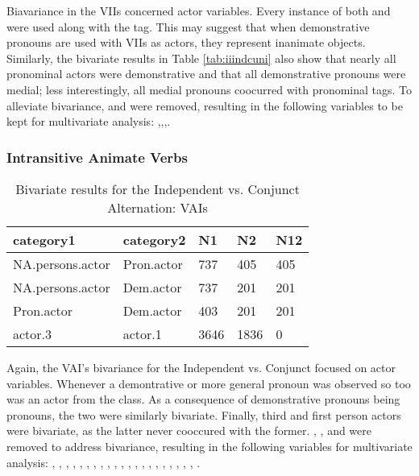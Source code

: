 Biavariance in the VIIs concerned actor variables. Every instance of both  and  were used along with the  tag. This may suggest that when demonstrative pronouns are used with VIIs as actors, they represent inanimate objects. Similarly, the bivariate results in Table \ref{tab:iiindcuni} also show that nearly all pronominal actors were demonstrative and that all demonstrative pronouns were medial; less interestingly, all medial pronouns coocurred with pronominal tags. To alleviate bivariance,  and  were removed, resulting in the following variables to be kept for multivariate analysis: ,,,.
\FloatBarrier

\FloatBarrier

\subsubsection{Intransitive Animate Verbs}

\begin{table}[H]
\centering
\begin{tabular}{lllll}
\toprule
category1        & category2  & N1   & N2   & N12 \\
\midrule
NA.persons.actor & Pron.actor & 737 & 405 & 405 \\
NA.persons.actor & Dem.actor & 737 & 201 & 201 \\
Pron.actor & Dem.actor & 403 & 201 & 201  \\
actor.3 & actor.1 & 3646 & 1836 & 0 \\
\bottomrule
\end{tabular}
\caption{
   Bivariate results for the Independent vs. Conjunct Alternation: VAIs \\ \label{tab:aicnjuni}
  }
\end{table}

Again, the VAI's bivariance for the Independent vs. Conjunct focused on actor variables. Whenever a demontrative or more general pronoun was observed so too was an actor from the  class. As a consequence of demonstrative pronouns being pronouns, the two were similarly bivariate. Finally, third and first person actors were bivariate, as the latter never cooccured with the former. , , and  were removed to address bivariance, resulting in the following variables for multivariate analysis: , , , , , , , , , , , , , , , , , , , , , .

